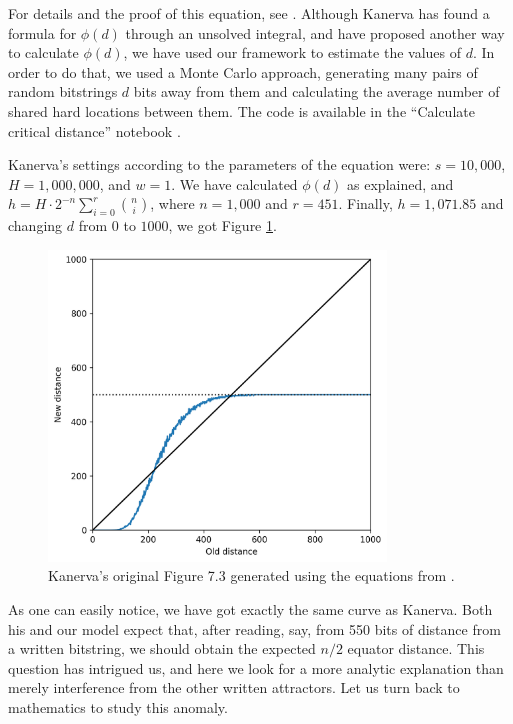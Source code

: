 For details and the proof of this equation, see \citet{brogliato2014sparse}. Although Kanerva has found a formula for $\phi(d)$ through an unsolved integral, and \citet{de1995geometrical} have proposed another way to calculate $\phi(d)$, we have used our framework to estimate the values of $d$. In order to do that, we used a Monte Carlo approach, generating many pairs of random bitstrings $d$ bits away from them and calculating the average number of shared hard locations between them. The code is available in the ``Calculate critical distance'' notebook \citep{sdmframework}.

Kanerva's settings according to the parameters of the equation were: $s=10,000$, $H=1,000,000$, and $w=1$. We have calculated $\phi(d)$ as explained, and $h = H \cdot 2^{-n} \sum_{i=0}^{r} \binom{n}{i}$, where $n=1,000$ and $r=451$. Finally, $h=1,071.85$ and changing $d$ from $0$ to $1000$, we got Figure \ref{fig:kanerva-figure-73-calculated}.

\begin{figure}[!htb]
\centering\includegraphics[width=0.8\textwidth]{./images02/calculated-table-72.png}
\caption{Kanerva's original Figure 7.3 generated using the equations from \citet{brogliato2014sparse}.
\label{fig:kanerva-figure-73-calculated}
}
\end{figure}

As one can easily notice, we have got exactly the same curve as Kanerva. Both his and our model expect that, after reading, say, from 550 bits of distance from a written bitstring, we should obtain the expected $n/2$ equator distance. This question has intrigued us, and here we look for a more analytic explanation than merely interference from the other written attractors. Let us turn back to mathematics to study this anomaly.

